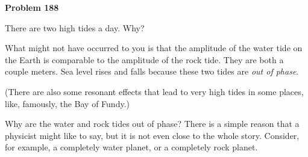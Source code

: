 \documentclass[12pt]{article}
\begin{document}
\begin{pottproblem}
\textbf{Problem 188}

There are two high tides a day. Why?

What might not have occurred to you is that the amplitude of the water
tide on the Earth is comparable to the amplitude of the rock
tide. They are both a couple meters. Sea level rises and falls because these
two tides are \emph{out of phase}.

(There are also some resonant effects that lead to very high tides in
some places, like, famously, the Bay of Fundy.)

Why are the water and rock tides out of phase? There is a simple
reason that a physicist might like to say, but it is not even close to
the whole story. Consider, for example, a completely water planet, or
a completely rock planet.

\end{pottproblem}
\end{document}
